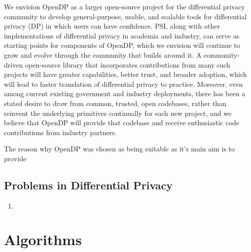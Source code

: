 \begin{displayquote}
We envision OpenDP as a larger open-source project for the differential privacy community to develop general-purpose, usable, and scalable tools for differential privacy (DP) in which users can have confidence. PSI, along with other implementations of differential privacy in academia and industry, can serve as starting points for components of OpenDP, which we envision will continue to grow and evolve through the community that builds around it. A community-driven open-source library that incorporates contributions from many such projects will have greater capabilities, better trust, and broader adoption, which will lead to faster translation of differential privacy to practice. Moreover, even among current existing government and industry deployments, there has been a stated desire to draw from common, trusted, open codebases, rather than reinvent the underlying primitives continually for each new project, and we believe that OpenDP will provide that codebase and receive enthusiastic code contributions from industry partners.
\end{displayquote}

The reason why OpenDP was chosen as being suitable as it's main aim is to provide


\subsection{Problems in Differential Privacy}
\begin{enumerate}
    \item 
\end{enumerate}

\section{Algorithms}

